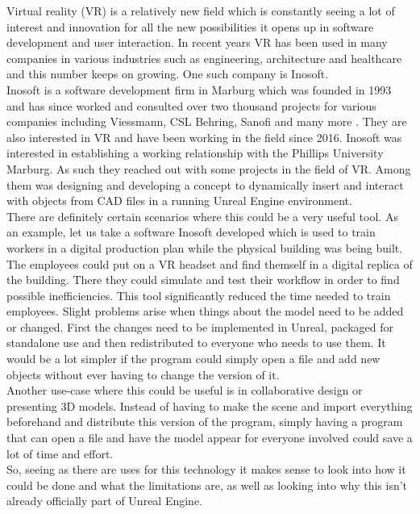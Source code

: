 Virtual reality (\acs{VR}) is a relatively new field which is constantly seeing a lot of interest and innovation for all the new possibilities it opens up in software development and user interaction. In recent years \acs{VR} has been used in many companies in various industries such as engineering, architecture and healthcare and this number keeps on growing\cite{bib:VRFields}. One such company is Inosoft.\\
Inosoft is a software development firm in Marburg which was founded in 1993 and has since worked and consulted over two thousand projects for various companies including Viessmann, CSL Behring, Sanofi and many more \cite{bib:InosoftAbout}. They are also interested in \acs{VR} and have been working in the field since 2016. Inosoft was interested in establishing a working relationship with the Phillips University Marburg. As such they reached out with some projects in the field of \acs{VR}. Among them was designing and developing a concept to dynamically insert and interact with objects from \acs{CAD} files in a running Unreal Engine environment.\\
There are definitely certain scenarios where this could be a very useful tool. As an example, let us take a software Inosoft developed which is used to train workers in a digital production plan while the physical building was being built\cite{bib:InosoftProject}. The employees could put on a VR headset and find themself in a digital replica of the building. There they could simulate and test their workflow in order to find possible inefficiencies. This tool significantly reduced the time needed to train employees. Slight problems arise when things about the model need to be added or changed. First the changes need to be implemented in Unreal, packaged for standalone use and then redistributed to everyone who needs to use them. It would be a lot simpler if the program could simply open a file and add new objects without ever having to change the version of it.\\
Another use-case where this could be useful is in collaborative design or presenting 3D models. Instead of having to make the scene and import everything beforehand and distribute this version of the program, simply having a program that can open a file and have the model appear for everyone involved could save a lot of time and effort.\\
So, seeing as there are uses for this technology it makes sense to look into how it could be done and what the limitations are, as well as looking into why this isn't already officially part of Unreal Engine.

